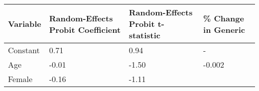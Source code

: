 \documentclass[
]{book}
\begin{document}
\begin{longtable}[]{@{}llll@{}}
\toprule
\begin{minipage}[b]{0.17\columnwidth}\raggedright
Variable\strut
\end{minipage} & \begin{minipage}[b]{0.25\columnwidth}\raggedright
Random-Effects Probit Coefficient\strut
\end{minipage} & \begin{minipage}[b]{0.25\columnwidth}\raggedright
Random-Effects Probit t-statistic\strut
\end{minipage} & \begin{minipage}[b]{0.21\columnwidth}\raggedright
\% Change in Generic\strut
\end{minipage}\tabularnewline
\midrule
\endhead
\begin{minipage}[t]{0.17\columnwidth}\raggedright
Constant\strut
\end{minipage} & \begin{minipage}[t]{0.25\columnwidth}\raggedright
0.71\strut
\end{minipage} & \begin{minipage}[t]{0.25\columnwidth}\raggedright
0.94\strut
\end{minipage} & \begin{minipage}[t]{0.21\columnwidth}\raggedright
-\strut
\end{minipage}\tabularnewline
\begin{minipage}[t]{0.17\columnwidth}\raggedright
Age\strut
\end{minipage} & \begin{minipage}[t]{0.25\columnwidth}\raggedright
-0.01\strut
\end{minipage} & \begin{minipage}[t]{0.25\columnwidth}\raggedright
-1.50\strut
\end{minipage} & \begin{minipage}[t]{0.21\columnwidth}\raggedright
-0.002\strut
\end{minipage}\tabularnewline
\begin{minipage}[t]{0.17\columnwidth}\raggedright
Female\strut
\end{minipage} & \begin{minipage}[t]{0.25\columnwidth}\raggedright
-0.16\strut
\end{minipage} & \begin{minipage}[t]{0.25\columnwidth}\raggedright
-1.11\strut
\end{minipage} & \begin{minipage}[t]{0.21\columnwidth}\raggedright

\end{minipage}
\end{longtable}
\end{document}
